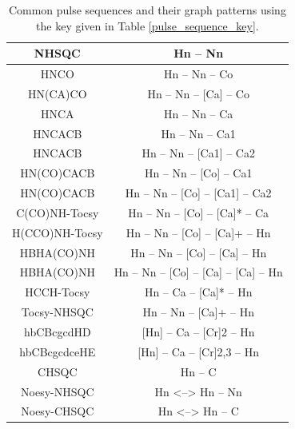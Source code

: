 \begin{table}
    \begin{tabular}{ | c | c | }
    \hline
    NHSQC           &  Hn -- Nn                                \\  \hline
    HNCO            &  Hn -- Nn -- Co                          \\  \hline
    HN(CA)CO        &  Hn -- Nn -- [Ca] -- Co                  \\  \hline
    HNCA            &  Hn -- Nn -- Ca                          \\  \hline
    HNCACB          &  Hn -- Nn -- Ca1                         \\  \hline
    HNCACB          &  Hn -- Nn -- [Ca1] -- Ca2                \\  \hline
    HN(CO)CACB      &  Hn -- Nn -- [Co] -- Ca1                 \\  \hline
    HN(CO)CACB      &  Hn -- Nn -- [Co] -- [Ca1] -- Ca2        \\  \hline
    C(CO)NH-Tocsy   &  Hn -- Nn -- [Co] -- [Ca]* -- Ca         \\  \hline
    H(CCO)NH-Tocsy  &  Hn -- Nn -- [Co] -- [Ca]+ -- Hn         \\  \hline
    HBHA(CO)NH      &  Hn -- Nn -- [Co] -- [Ca] -- Hn          \\  \hline
    HBHA(CO)NH      &  Hn -- Nn -- [Co] -- [Ca] -- [Ca] -- Hn  \\  \hline
    HCCH-Tocsy      &  Hn -- Ca -- [Ca]* -- Hn                 \\  \hline
    Tocsy-NHSQC     &  Hn -- Nn -- [Ca]+ -- Hn                 \\  \hline
    hbCBcgcdHD      &  [Hn] -- Ca -- [Cr]{2} -- Hn             \\  \hline
    hbCBcgcdceHE    &  [Hn] -- Ca -- [Cr]{2,3} -- Hn           \\  \hline  
    CHSQC           &  Hn -- C                                 \\  \hline
    Noesy-NHSQC     &  Hn <--> Hn -- Nn                        \\  \hline
    Noesy-CHSQC     &  Hn <--> Hn -- C                         \\  \hline
    \end{tabular}
    \caption{Common pulse sequences and their graph patterns using the key
             given in Table \ref{pulse_sequence_key}.}
    \label{pulse_sequence_patterns}
\end{table}

